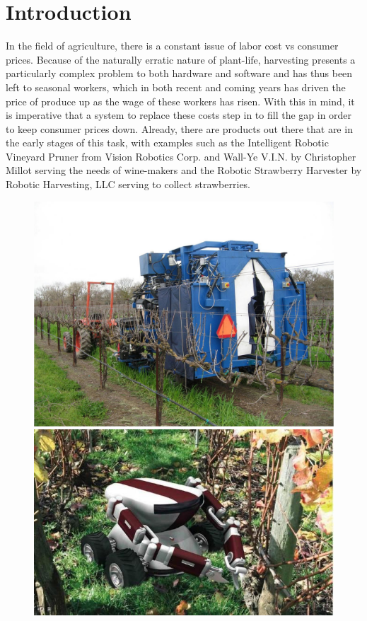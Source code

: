 \documentclass[titlepage]{article}
\begin{document}
\section{Introduction}
In the field of agriculture, there is a constant issue of labor cost vs consumer prices. Because of the naturally erratic nature of plant-life, harvesting presents a particularly complex problem to both hardware and software and has thus been left to seasonal workers, which in both recent and coming years has driven the price of produce up as the wage of these workers has risen. With this in mind, it is imperative that a system to replace these costs step in to fill the gap in order to keep consumer prices down. Already, there are products out there that are in the early stages of this task, with examples such as the Intelligent Robotic Vineyard Pruner from Vision Robotics Corp. and Wall-Ye V.I.N. by Christopher Millot serving the needs of wine-makers and the Robotic Strawberry Harvester by Robotic Harvesting, LLC serving to collect strawberries.
\begin{figure}[h!]
\centering
\begin{minipage}{.5\textwidth}
  \centering
  \includegraphics[width=.8\linewidth]{Images/blueTrain.jpg}
\end{minipage}%
\begin{minipage}{.5\textwidth}
  \centering
  \includegraphics[width=.8\linewidth]{Images/brownrobot.jpg}
\end{minipage}
\end{figure}
\end{document}

